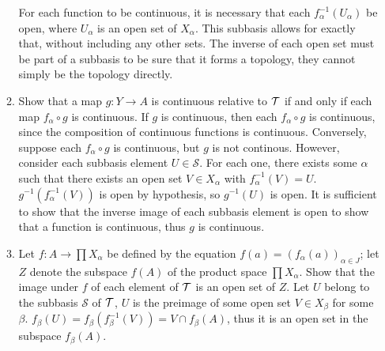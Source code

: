 \documentclass[12pt,letterpaper]{article}
\begin{document}
\begin{enumerate}
\begin{enumerate}
    \indent For each function to be continuous, it is necessary that each $f_\alpha^{-1}(U_\alpha)$ be open, where $U_\alpha$ is an open set of $X_\alpha$. This subbasis allows for exactly that, without including any other sets. The inverse of each open set must be part of a subbasis to be sure that it forms a topology, they cannot simply be the topology directly.
    \item Show that a map $g: Y\rightarrow A$ is continuous relative to $\mathcal{T}$ if and only if each map $f_\alpha \circ g$ is continuous.\hspace{5in}\n
    \indent If $g$ is continuous, then each $f_\alpha \circ g$ is continuous, since the composition of continuous functions is continuous. Conversely, suppose each $f_\alpha \circ g$ is continuous, but $g$ is not continous. %
    However, consider each subbasis element $U\in\mathcal{S}$. For each one, there exists some $\alpha$ such that there exists an open set $V\in X_\alpha$ with $f_\alpha^{-1}(V)=U$. $g^{-1}(f^{-1}_\alpha(V))$ is open by hypothesis, so $g^{-1}(U)$ is open. It is sufficient to show that the inverse image of each subbasis element is open to show that a function is continuous, thus $g$ is continuous.
    \item Let $f: A\rightarrow \prod X_\alpha$ be defined by the equation $f(a) = (f_\alpha(a))_{\alpha\in J}$; let $Z$ denote the subspace $f(A)$ of the product space $\prod X_\alpha$. Show that the image under $f$ of each element of $\mathcal{T}$ is an open set of $Z$. \hspace{5in}\n
    \indent %
    Let $U$ belong to the subbasis $\mathcal{S}$ of $\mathcal{T}$, $U$ is the preimage of some open set $V\in X_\beta$ for some $\beta$. $f_\beta(U) = f_\beta(f_\beta^{-1}(V)) = V \cap f_\beta(A)$, thus it is an open set in the subspace $f_\beta(A)$.\n

\end{enumerate}
\end{enumerate}
\end{document}
